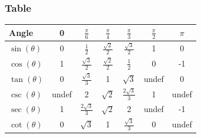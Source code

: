 \documentclass[a5paper]{article}
\begin{document}
	\subsubsection{Table}
	\begin{center}
	\begin{tabular}{ | l || c | c | c | c | c | c | }
		\hline
		Angle & 0 & $\frac{\pi}{6}$ & $\frac{\pi}{4}$ & $\frac{\pi}{3}$ & $\frac{\pi}{2}$ & $\pi$ \\
		\hline
		$\sin(\theta)$ & 0 & $\frac{1}{2}$ & $\frac{\sqrt{2}}{2}$ & $\frac{\sqrt{3}}{2}$ & 1 & 0 \\
		\hline
		$\cos(\theta)$ & 1 & $\frac{\sqrt{3}}{2}$ & $\frac{\sqrt{2}}{2}$ & $\frac{1}{2}$ & 0 & -1 \\
		\hline
		$\tan(\theta)$ & 0 & $\frac{\sqrt{3}}{3}$ & 1 & $\sqrt{3}$ & undef & 0 \\
		\hline
		$\csc(\theta)$ & undef & 2 & $\sqrt{2}$ & $\frac{2\sqrt{3}}{3}$ & 1 & undef \\
		\hline
		$\sec(\theta)$ & 1 & $\frac{2\sqrt{3}}{3}$ & $\sqrt{2}$ & 2 & undef & -1 \\
		\hline
		$\cot(\theta)$ & 0 & $\sqrt{3}$ & 1 & $\frac{\sqrt{3}}{3}$ & 0 & undef \\
		\hline
	\end{tabular}
	\end{center}
\end{document}
